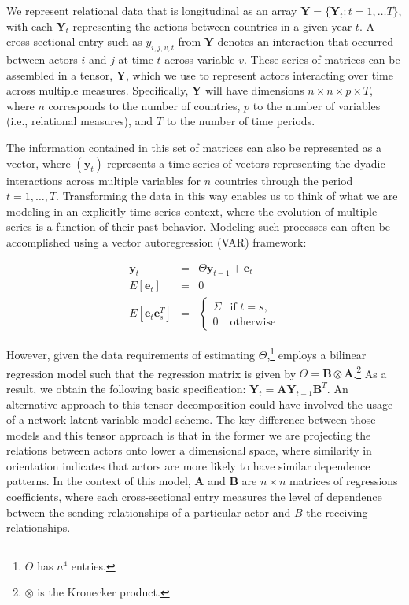 \documentclass[12pt,pdflatex]{elsarticle}
\newcommand{\bl}[1]{{\mathbf #1}}
\begin{document}
We represent relational data that is longitudinal as an array $\bl Y = \{\bl Y_t : t = 1, \ldots T\}$, with each $\bl Y_t$ representing the actions between countries in a given year $t$. A cross-sectional entry such as $y_{i,j,v,t}$ from $\bl Y$ denotes an interaction that occurred between actors $i$ and $j$ at time $t$ across variable $v$. These series of matrices can be assembled in a tensor, $\bl Y$, which we use to represent actors interacting over time across multiple measures. Specifically, $\bl Y$ will have dimensions $n \times n \times p \times T$, where $n$ corresponds to the number of countries, $p$ to the number of variables (i.e., relational measures), and $T$ to the number of time periods.

The information contained in this set of matrices can also be represented as a vector, where $(\mathbf y_t)$ represents a time series of vectors representing the dyadic interactions across multiple variables for $n$ countries through the period $t = 1, \ldots, T$. Transforming the data in this way enables us to think of what we are modeling in an explicitly time series context, where the evolution of multiple series is a function of their past behavior. Modeling such processes can often be accomplished using a vector autoregression (VAR) framework:

\begin{eqnarray}
	\bl y_t &=& { \Theta \bl y_{t-1} +\bl e_t}\\
	E[\bl e_t] &=& 0 \\
	E[\bl e_t \bl e^T_s] &=& \begin{cases}   \Sigma &\mbox{if } t=s, \\ 0 &\mbox{otherwise}\end{cases}
\end{eqnarray}

However, given the data requirements of estimating $\Theta$,\footnote{$\Theta$ has $n^4$ entries.} \citet{hoff:2015} employs a bilinear regression model such that the regression matrix is given by $ \Theta = \bl B \otimes \bl A$.\footnote{$\otimes$ is the Kronecker product.} As a result, we obtain the following basic specification: $\bl Y_t = \bl A \bl Y_{t-1}\bl B^T$. An alternative approach to this tensor decomposition could have involved the usage of a network latent variable model scheme. The key difference between those models and this tensor approach is that in the former we are projecting the relations between actors onto lower a dimensional space, where similarity in orientation indicates that actors are more likely to have similar dependence patterns. In the context of this model, $\bl A$ and $\bl B$ are $n \times n$ matrices of regressions coefficients, where each cross-sectional entry measures the level of dependence between the sending relationships of a particular actor and  $B$ the receiving relationships.
\end{document}
